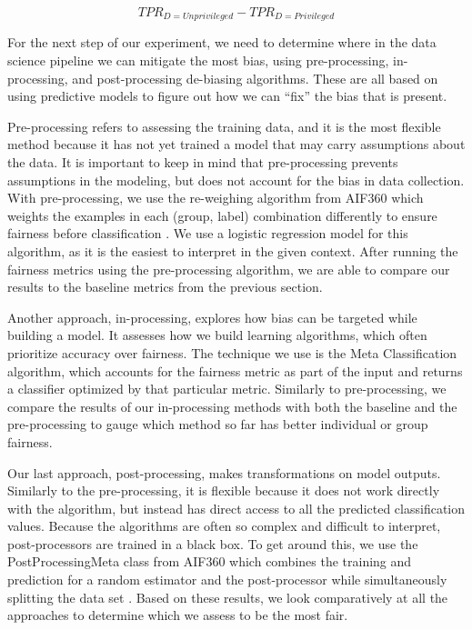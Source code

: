 \documentclass[water,article,submit,moreauthors,pdftex]{mdpi}
\begin{document}
\[TPR_{D = Unprivileged} - TPR_{D = Privileged}\]

For the next step of our experiment, we need to determine where in the
data science pipeline we can mitigate the most bias, using
pre-processing, in-processing, and post-processing de-biasing
algorithms. These are all based on using predictive models to figure out
how we can ``fix'' the bias that is present.

Pre-processing refers to assessing the training data, and it is the most
flexible method because it has not yet trained a model that may carry
assumptions about the data. It is important to keep in mind that
pre-processing prevents assumptions in the modeling, but does not
account for the bias in data collection. With pre-processing, we use the
re-weighing algorithm from AIF360 which weights the examples in each
(group, label) combination differently to ensure fairness before
classification \citep{aif360-oct-2018}. We use a logistic regression
model for this algorithm, as it is the easiest to interpret in the given
context. After running the fairness metrics using the pre-processing
algorithm, we are able to compare our results to the baseline metrics
from the previous section.

Another approach, in-processing, explores how bias can be targeted while
building a model. It assesses how we build learning algorithms, which
often prioritize accuracy over fairness. The technique we use is the
Meta Classification algorithm, which accounts for the fairness metric as
part of the input and returns a classifier optimized by that particular
metric. Similarly to pre-processing, we compare the results of our
in-processing methods with both the baseline and the pre-processing to
gauge which method so far has better individual or group fairness.

Our last approach, post-processing, makes transformations on model
outputs. Similarly to the pre-processing, it is flexible because it does
not work directly with the algorithm, but instead has direct access to
all the predicted classification values. Because the algorithms are
often so complex and difficult to interpret, post-processors are trained
in a black box. To get around this, we use the PostProcessingMeta class
from AIF360 which combines the training and prediction for a random
estimator and the post-processor while simultaneously splitting the data
set \citep{aif360-oct-2018}. Based on these results, we look
comparatively at all the approaches to determine which we assess to be
the most fair.
\end{document}
